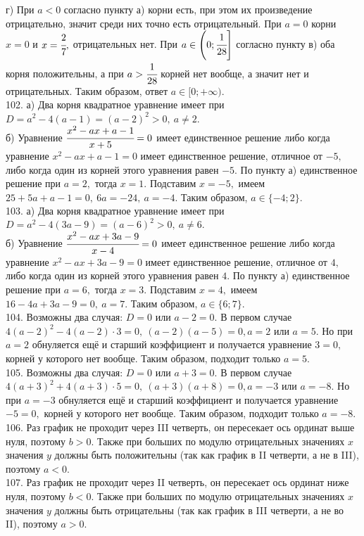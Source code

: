г) При $a<0$ согласно пункту а) корни есть, при этом их произведение отрицательно, значит среди них точно есть отрицательный. При $a=0$ корни $x=0$ и $x=\cfrac{2}{7},$ отрицательных нет. При $a\in\left(0;\cfrac{1}{28}\right]$ согласно пункту в) оба корня положительны, а при $a>\cfrac{1}{28}$ корней нет вообще, а значит нет и отрицательных. Таким образом, ответ $a\in[0;+\infty).$\\
102. а) Два корня квадратное уравнение имеет при $D=a^2-4(a-1)=(a-2)^2>0,\ a\neq2.$\\
б) Уравнение $\cfrac{x^2-ax+a-1}{x+5}=0$ имеет единственное решение либо когда уравнение $x^2-ax+a-1=0$ имеет единственное решение, отличное от $-5,$ либо когда один из корней этого уравнения равен $-5.$ По пункту а) единственное решение при $a=2,$ тогда $x=1.$ Подставим $x=-5,$ имеем $25+5a+a-1=0,\ 6a=-24,\ a=-4.$ Таким образом, $a\in\{-4;2\}.$\\
103. а) Два корня квадратное уравнение имеет при $D=a^2-4(3a-9)=(a-6)^2>0,\ a\neq6.$\\
б) Уравнение $\cfrac{x^2-ax+3a-9}{x-4}=0$ имеет единственное решение либо когда уравнение $x^2-ax+3a-9=0$ имеет единственное решение, отличное от $4,$ либо когда один из корней этого уравнения равен $4.$ По пункту а) единственное решение при $a=6,$ тогда $x=3.$ Подставим $x=4,$ имеем $16-4a+3a-9=0,\ a=7.$ Таким образом, $a\in\{6;7\}.$\\
104. Возможны два случая: $D=0$ или $a-2=0.$ В первом случае $4(a-2)^2-4(a-2)\cdot3=0,\ (a-2)(a-5)=0, a=2$ или $a=5.$ Но при $a=2$ обнуляется ещё и старший коэффициент и получается уравнение $3=0,$ корней у которого нет вообще. Таким образом, подходит только $a=5.$\\
105. Возможны два случая: $D=0$ или $a+3=0.$ В первом случае $4(a+3)^2+4(a+3)\cdot5=0,\ (a+3)(a+8)=0, a=-3$ или $a=-8.$ Но при $a=-3$ обнуляется ещё и старший коэффициент и получается уравнение $-5=0,$ корней у которого нет вообще. Таким образом, подходит только $a=-8.$\\
106. Раз график не проходит через III четверть, он пересекает ось ординат выше нуля, поэтому $b>0.$ Также при больших по модулю отрицательных значениях $x$ значения $y$ должны быть положительны (так как график в II четверти, а не в III), поэтому $a<0.$\\
107. Раз график не проходит через II четверть, он пересекает ось ординат ниже нуля, поэтому $b<0.$ Также при больших по модулю отрицательных значениях $x$ значения $y$ должны быть отрицательны (так как график в III четверти, а не во II), поэтому $a>0.$\\
